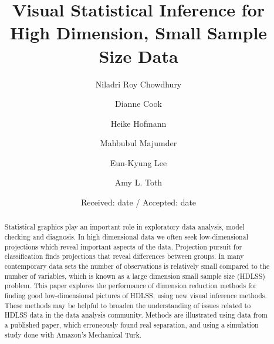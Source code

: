 \topmargin -0.10in   %
\textheight 8.5in  %






\title{Visual Statistical Inference for High Dimension, Small Sample Size Data}\label{ch:largepsmalln}
\vspace{-0.8cm}
\author{Niladri Roy Chowdhury \and 
Dianne Cook \and
Heike Hofmann \and
Mahbubul Majumder \and
Eun-Kyung Lee \and
Amy L. Toth}


\date{Received: date / Accepted: date}

\maketitle

\begin{abstract}
Statistical graphics play an important role in exploratory data analysis, model checking and diagnosis. In high dimensional data we often seek low-dimensional projections which reveal important aspects of the data. Projection pursuit for classification finds projections that reveal differences between groups. In many contemporary data sets the number of observations is relatively small compared to the number of variables, which is known as a large dimension small sample size (HDLSS) problem. This paper explores the performance of dimension reduction methods for finding good low-dimensional pictures of HDLSS, using new visual inference methods. These methods may be helpful to broaden the understanding of issues related to HDLSS data in the data analysis community. Methods are illustrated using data from a published paper, which erroneously found real separation, and using a simulation study done with Amazon's Mechanical Turk.

\end{abstract}


